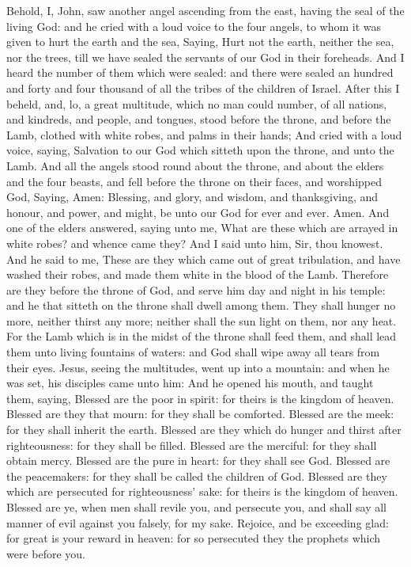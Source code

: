  Behold, I, John, saw another angel ascending from the east, having the seal of the living God: and he cried with a loud voice to the four angels, to whom it was given to hurt the earth and the sea, Saying, Hurt not the earth, neither the sea, nor the trees, till we have sealed the servants of our God in their foreheads. And I heard the number of them which were sealed: and there were sealed an hundred and forty and four thousand of all the tribes of the children of Israel. After this I beheld, and, lo, a great multitude, which no man could number, of all nations, and kindreds, and people, and tongues, stood before the throne, and before the Lamb, clothed with white robes, and palms in their hands; And cried with a loud voice, saying, Salvation to our God which sitteth upon the throne, and unto the Lamb. And all the angels stood round about the throne, and about the elders and the four beasts, and fell before the throne on their faces, and worshipped God, Saying, Amen: Blessing, and glory, and wisdom, and thanksgiving, and honour, and power, and might, be unto our God for ever and ever. Amen. And one of the elders answered, saying unto me, What are these which are arrayed in white robes? and whence came they? And I said unto him, Sir, thou knowest. And he said to me, These are they which came out of great tribulation, and have washed their robes, and made them white in the blood of the Lamb. Therefore are they before the throne of God, and serve him day and night in his temple: and he that sitteth on the throne shall dwell among them. They shall hunger no more, neither thirst any more; neither shall the sun light on them, nor any heat. For the Lamb which is in the midst of the throne shall feed them, and shall lead them unto living fountains of waters: and God shall wipe away all tears from their eyes.
 Jesus, seeing the multitudes, went up into a mountain: and when he was set, his disciples came unto him: And he opened his mouth, and taught them, saying, Blessed are the poor in spirit: for theirs is the kingdom of heaven. Blessed are they that mourn: for they shall be comforted. Blessed are the meek: for they shall inherit the earth. Blessed are they which do hunger and thirst after righteousness: for they shall be filled. Blessed are the merciful: for they shall obtain mercy. Blessed are the pure in heart: for they shall see God. Blessed are the peacemakers: for they shall be called the children of God. Blessed are they which are persecuted for righteousness' sake: for theirs is the kingdom of heaven. Blessed are ye, when men shall revile you, and persecute you, and shall say all manner of evil against you falsely, for my sake. Rejoice, and be exceeding glad: for great is your reward in heaven: for so persecuted they the prophets which were before you.

